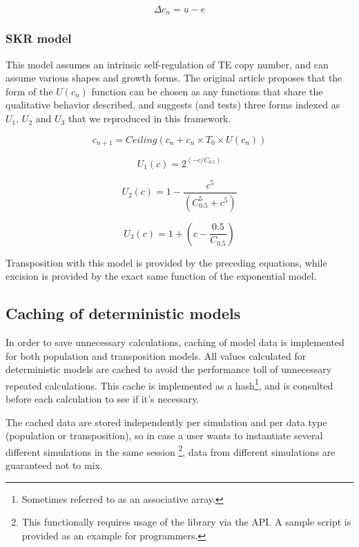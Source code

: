 \documentclass[10pt]{article}
\begin{document}
\begin{equation}
  \Delta c_n = u - e
\end{equation}


\subsubsection{SKR model}

This model assumes an intrinsic self-regulation of TE copy number, and
can assume various shapes and growth forms. The original article
proposes that the form of the $U(c_n)$ function can be chosen as any
functions that share the qualitative behavior described, and suggests
(and tests) three forms indexed as $U_1$, $U_2$ and $U_3$ that we
reproduced in this framework.

\begin{equation}
  c_{n+1} = Ceiling(c_n + c_n \times T_0 \times U (c_n ))
\end{equation}

\begin{equation}
  U_1(c) = 2^{(-c/C_{0.5})}
\end{equation}

\begin{equation}
  U_2 (c) = 1 - \frac{c^5} {(C_{0.5}^5 + c^5 )}
\end{equation}

\begin{equation}
  U_3 (c) = 1 + (c - \frac{0.5}{C_{0.5}} )
\end{equation}

Transposition with this model is provided by the preceding equations,
while excision is provided by the exact same function of the
exponential model.

\subsection{Caching of deterministic models}
\label{section:impl_caching}

In order to save unnecessary calculations, caching of model data is
implemented for both population and transposition models. All values
calculated for deterministic models are cached to avoid the
performance toll of unnecessary repeated calculations. This cache is
implemented as a hash\footnote{Sometimes referred to as an associative
  array.}, and is consulted before each calculation to see if it's
necessary.

The cached data are stored independently per simulation and per data
type (population or transposition), so in case a user wants to
instantiate several different simulations in the same
session \footnote{This functionally requires usage of the library via
  the API. A sample script is provided as an example for
  programmers.}, data from different simulations are guaranteed not to
mix.
\end{document}
